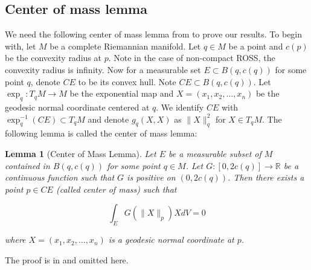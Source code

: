\documentclass{amsart}
\numberwithin{equation}{section}
\theoremstyle{plain}
\newtheorem{lemma}[theorem]{Lemma}
\theoremstyle{definition}
\theoremstyle{remark}
\begin{document}
\subsection{Center of mass lemma}
We need the following center of mass lemma from \cite{Santhanam2007} to prove our results. To begin with, let $M$ be a complete Riemannian manifold. Let $q\in M$ be a point and $c(p)$ be the convexity radius at $p$. Note in the case of non-compact ROSS, the convexity radius is infinity. Now for a measurable set $E\subset B(q,c(q))$ for some point $q$, denote $CE$ to be its convex hull. Note $CE\subset B(q,c(q))$. Let $\exp _q: T_q M \to M$ be the exponential map and $X=\left(x_1, x_2, \ldots, x_n\right)$ be the geodesic normal coordinate centered at $q$. We identify $C E$ with $\exp _q^{-1}(C E)\subset T_q M$ and denote $g_q(X, X)$ as $\|X\|_q^2$ for $X \in T_q M$. The following lemma is called the center of mass lemma:
\begin{lemma}[Center of Mass Lemma]\label{CenterOfMassLemma}
    Let $E$ be a measurable subset of $M$ contained in $B\left(q, c\left(q\right)\right)$ for some point $q \in M$. Let $G:\left[0,2 c\left(q\right)\right] \rightarrow \mathbb{R}$ be a continuous function such that $G$ is positive on $\left(0,2 c\left(q\right)\right)$. Then there exists a point $p \in C E$ (called center of mass) such that

$$
\int_E G\left(\|X\|_p\right) X d V=0
$$

where $X=\left(x_1, x_2, \ldots, x_n\right)$ is a geodesic normal coordinate at $p$.
\end{lemma}
The proof is in \cite{Santhanam2007} and omitted here.
\end{document}
